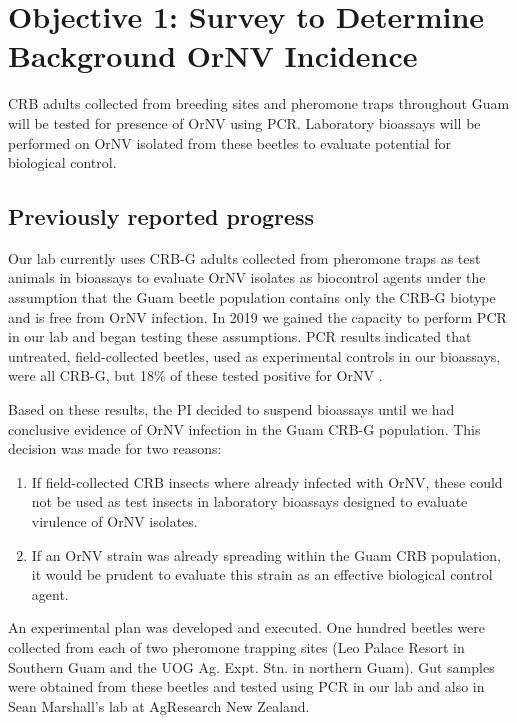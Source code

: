 \documentclass[12pt,letterpaper,english,bibliography=totocnumbered, abstract=on]{scrartcl}
\begin{document}
\clearpage

\section{Objective 1: Survey to Determine Background OrNV Incidence} 

\begin{framed}
CRB adults collected from breeding sites and pheromone traps throughout Guam will be tested for presence of OrNV using PCR.  Laboratory bioassays will be performed on OrNV isolated from these beetles to evaluate potential for biological control.
\end{framed} 

\subsection{Previously reported progress}

Our lab currently uses CRB-G adults collected from pheromone traps as test animals in bioassays to evaluate OrNV isolates as biocontrol agents under the assumption that the Guam beetle population contains only the CRB-G biotype and is free from OrNV infection. In 2019 we gained the capacity to perform PCR in our lab and began testing these assumptions. PCR results indicated that untreated, field-collected beetles, used as experimental controls in our bioassays, were all CRB-G, but 18\% of these tested positive for OrNV \cite{graselaTechnicalReportPolymerase2020, graselaTechnicalReportPolymerase2020a}.

Based on these results, the PI decided to suspend bioassays until we had conclusive evidence of OrNV infection in the Guam CRB-G population.  This decision was made for two reasons:

\begin{enumerate}
	\item If field-collected CRB insects where already infected with OrNV, these could not be used as test insects in laboratory bioassays designed to evaluate virulence of OrNV isolates.
	\item If an OrNV strain was already spreading within the Guam CRB population, it would be prudent to evaluate this strain as an effective biological control agent. 
\end{enumerate}

An experimental plan \cite{mooreExperimentalPlanDetermining2020} was developed and executed. One hundred beetles were collected from each of two pheromone trapping sites (Leo Palace Resort in Southern Guam and the UOG Ag. Expt. Stn. in northern Guam). Gut samples were obtained from these beetles and tested using PCR in our lab and also in Sean Marshall's lab at AgResearch New Zealand. 
\end{document}
